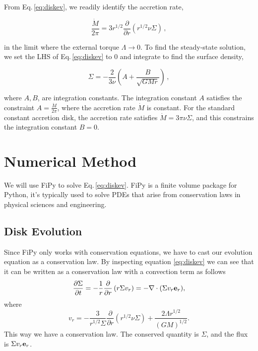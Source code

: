 \documentclass{article}
\begin{document}
From Eq.\,\ref{eq:diskev}, we readily identify the accretion rate,

\begin{equation}
\frac{\dot{M}}{2\pi} = 3 r^{1/2} \frac{\partial}{\partial r} \left(r^{1/2} \nu \Sigma\right)\,,
\end{equation}

in the limit where the external torque $\Lambda \rightarrow 0$. To find the steady-state solution, we set the LHS of Eq.\,\ref{eq:diskev} to 0 and integrate to find the surface density,

\begin{equation}
\Sigma = -\frac{2}{3 \nu} \left(A+  \frac{B}{\sqrt{G M r}}\right)\,,
\end{equation}

where $A, B$, are integration constants. The integration constant $A$ satisfies the constraint $A = \frac{\dot{M}}{2\pi}$, where the accretion rate $\dot{M}$ is constant. For the standard constant accretion disk, the accretion rate satisfies $\dot{M} = 3\pi \nu \Sigma$, and this constrains the integration constant $B = 0$.

\section{Numerical Method}

We will use FiPy to solve Eq.\,\ref{eq:diskev}. FiPy is a finite volume package for Python, it's typically used to
solve PDEs that arise from conservation laws in physical sciences and engineering.

\subsection{Disk Evolution}
Since FiPy only works with conservation equations, we have to cast our evolution equation as a conservation law.
By inspecting equation \ref{eq:diskev} we can see that it can be written as a conservation law with a convection 
term as follows
\begin{equation} \label{eq:conservation}
\frac{\partial \Sigma}{\partial t} = -\frac{1}{r} \frac{\partial}{\partial r} \left( r \Sigma v_{r}\right)=-\nabla\cdot (\Sigma v_r \bold{e}_{r}),
\end{equation}
where
\begin{equation} \label{eq:vr}
v_r = -\frac{3}{r^{1/2}\Sigma} \frac{\partial}{\partial r} \left(r^{1/2} \nu \Sigma\right) + \frac{2 \Lambda r^{1/2}}{(G M)^{1/2}}.
\end{equation}
This way we have a conservation law. The conserved quantity is $\Sigma$, and the flux is $\Sigma v_r \bold{e}_r$.
\end{document}
